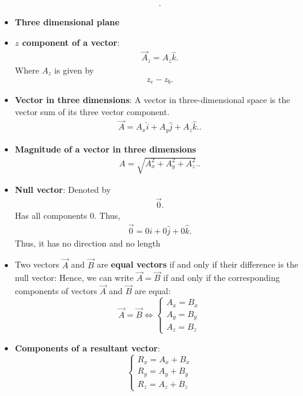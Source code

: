 \documentclass{report}
\begin{document}
\begin{itemize}
\begin{align*}
            .\end{align*}
        \item \textbf{Three dimensional plane}
            \bigbreak \noindent 
        \item \textbf{$z$ component of a vector}:
            \begin{align*}
                \vec{A}_{z} = A_{z}\hat{k} 
            .\end{align*}
            Where $A_{z}$ is given by 
            \begin{align*}
                z_{e} - z_{b}
            .\end{align*}
        \item \textbf{Vector in three dimensions}: A vector in three-dimensional space is the vector sum of its three vector component. 
            \begin{align*}
                \vec{A} = A_x \hat{i} + A_y \hat{j} + A_z \hat{k}.
            .\end{align*}
        \item \textbf{Magnitude of a vector in three dimensions}
            \begin{align*}
                A = \sqrt{A_x^2 + A_y^2 + A_z^2}.
            .\end{align*}
        \item \textbf{Null vector}: Denoted by 
            \begin{align*}
                \vec{0}
            .\end{align*}
            Has all components 0. Thus, 
            \begin{align*}
                \vec{0} = 0\hat{i} + 0\hat{j} + 0\hat{k}
            .\end{align*}
            Thus, it has no direction and no length
        \item Two vectors $\vec{A}$ and $\vec{B}$ are \textbf{equal vectors} if and only if their difference is the null vector:
        Hence, we can write $\vec{A} = \vec{B}$ if and only if the corresponding components of vectors $\vec{A}$ and $\vec{B}$ are equal:
        \[
        \vec{A} = \vec{B} \Leftrightarrow
        \left\{
            \begin{array}{l}
                A_x = B_x \\
                A_y = B_y \\
                A_z = B_z
            \end{array}
        \right.
        \]
    \item \textbf{Components of a resultant vector}:
        \begin{equation}
            \begin{cases}
                R_{x} = A_{x}  + B_{x} \\
                R_{y} = A_{y}  + B_{y} \\
                R_{z} = A_{z}  + B_{z} 
            \end{cases}
        \end{equation}


\end{itemize}
\end{document}
